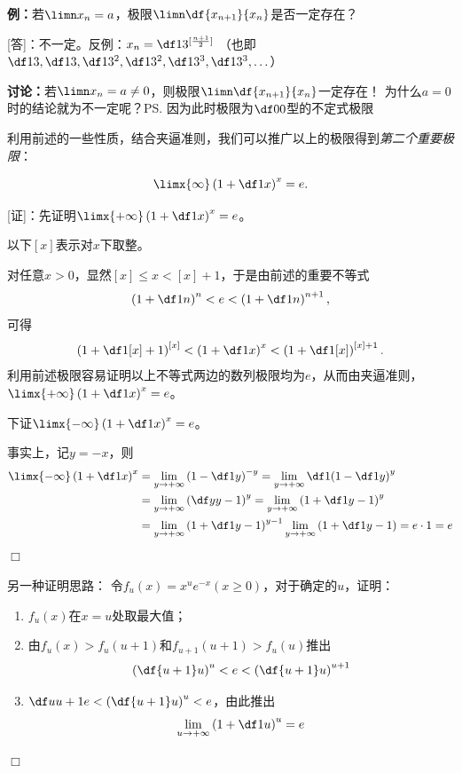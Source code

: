 {\bf 例：}若$\limn x_n=a$，极限$\limn\df{x_{n+1}}{x_n}$是否一定存在？

[答]：不一定。反例：$x_n=\df1{3^{[\frac{n+1}2]}}$ （也即
$\df13, \df13, \df 1{3^2}, \df1{3^2}, \df1{3^3}, \df1{3^3},\ldots$）

{\bf 讨论：}若$\limn x_n=a\ne 0$，则极限$\limn\df{x_{n+1}}{x_n}$一定存在！
为什么$a=0$时的结论就为不一定呢？\ps{因为此时极限为$\df00$型的不定式极限}


利用前述的一些性质，结合夹逼准则，我们可以推广以上的极限得到{\it 第二个重要极限}：
\begin{thx}
	$$\limx{\infty}\left(1+\df1x\right)^x=e.$$
\end{thx}

[证]：先证明$\limx{+\infty}\left(1+\df1x\right)^x=e$。

以下$[x]$表示对$x$下取整。

对任意$x>0$，显然$[x]\leq x<[x]+1$，于是由前述的重要不等式
$$\left(1+\df1n\right)^n<e<\left(1+\df1n\right)^{n+1},$$
可得
$$\left(1+\df1{[x]+1}\right)^{[x]}<\left(1+\df1x\right)^x
<\left(1+\df1{[x]}\right)^{[x]+1}.$$
利用前述极限容易证明以上不等式两边的数列极限均为$e$，从而由夹逼准则，
$\limx{+\infty}\left(1+\df1x\right)^x=e$。

下证$\limx{-\infty}\left(1+\df1x\right)^x=e$。

事实上，记$y=-x$，则
\begin{align*}
	\limx{-\infty}\left(1+\df1x\right)^x
	&=\lim\limits_{y\to+\infty}\left(1-\df1y\right)^{-y}
	=\lim\limits_{y\to+\infty}\df1{\left(1-\df1y\right)^{y}}\\
	&=\lim\limits_{y\to+\infty}\left(\df y{y-1}\right)^{y}
	=\lim\limits_{y\to+\infty}\left(1+\df1{y-1}\right)^{y}\\
	&=\lim\limits_{y\to+\infty}\left(1+\df1{y-1}\right)^{y-1}
	\lim\limits_{y\to+\infty}\left(1+\df1{y-1}\right)=e\cdot1=e
\end{align*}
\hfill $\Box$

\begin{shaded}
另一种证明思路：
令$f_u(x)=x^ue^{-x}(x\geq 0)$，对于确定的$u$，证明：
\begin{enumerate}[(1)]
  \setlength{\itemindent}{1cm}
  \item $f_u(x)$在$x=u$处取最大值；
  \item 由$f_u(x)>f_u(u+1)$和$f_{u+1}(u+1)>f_u(u)$推出
  $$\left(\df{u+1}u\right)^u<e<\left(\df{u+1}u\right)^{u+1}$$
  \item $\df u{u+1}e<\left(\df{u+1}u\right)^u<e$，由此推出
  $$\lim\limits_{u\to+\infty}\left(1+\df 1u\right)^u=e$$
\end{enumerate}
\hfill $\Box$
\end{shaded}

